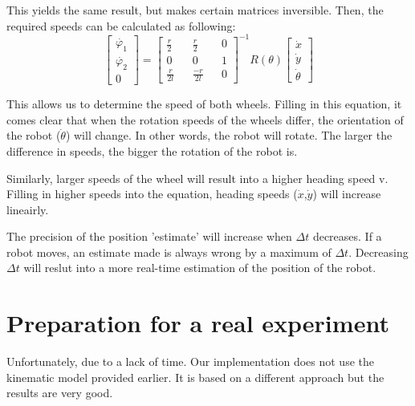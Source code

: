 \documentclass[12pt]{article}
\begin{document}
This yields the same result, but makes certain matrices inversible. Then, the required speeds can be calculated as following:
\begin{equation}
\begin{bmatrix}
\dot{\varphi_1} \\
\dot{\varphi_2} \\
0
\end{bmatrix}
= 
\begin{bmatrix} \frac{r}{2} && \frac{r}{2} && 0 \\ 
0 && 0  && 1\\ 
\frac{r}{2l} && \frac{-r}{2l} && 0\end{bmatrix}^{-1}
R(\theta)
\begin{bmatrix} \dot{x} \\ \dot{y} \\ \dot{\theta} \end{bmatrix}
\end{equation}

This allows us to determine the speed of both wheels.
Filling in this equation, it comes clear that when the rotation speeds of the wheels differ, the orientation of the robot ($\dot{\theta}$) will change. In other words, the robot will rotate. The larger the difference in speeds, the bigger the rotation of the robot is.

Similarly, larger speeds of the wheel will result into a higher heading speed v. Filling in higher speeds into the equation, heading speeds  ($\dot{x}$,$\dot{y}$) will increase lineairly. 

The precision of the position 'estimate' will increase when ${\Delta}t$ decreases. If a robot moves, an estimate made is always wrong by a maximum of ${\Delta}t$. Decreasing ${\Delta}t$ will reslut into a more real-time estimation of the position of the robot. 
\section{Preparation for a real experiment}
Unfortunately, due to a lack of time. Our implementation does not use the kinematic model provided earlier. It is based on a different approach but the results are very good.
\end{document}
